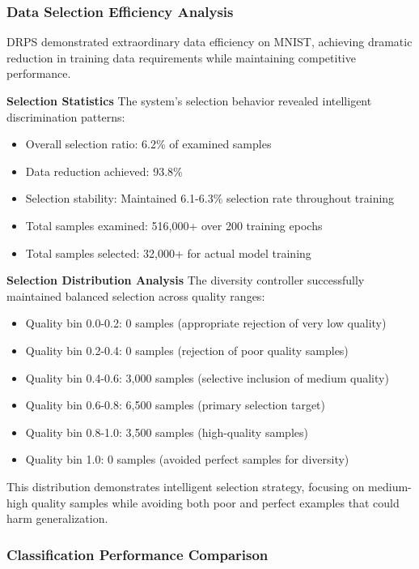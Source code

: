 \documentclass[12pt]{article}
\begin{document}
\subsubsection{Data Selection Efficiency Analysis}\label{selection-efficiency}

DRPS demonstrated extraordinary data efficiency on MNIST, achieving dramatic reduction in training data requirements while maintaining competitive performance.

\textbf{Selection Statistics}
The system's selection behavior revealed intelligent discrimination patterns:
\begin{itemize}
\item Overall selection ratio: 6.2\% of examined samples
\item Data reduction achieved: 93.8\%
\item Selection stability: Maintained 6.1-6.3\% selection rate throughout training
\item Total samples examined: 516,000+ over 200 training epochs
\item Total samples selected: 32,000+ for actual model training
\end{itemize}

\textbf{Selection Distribution Analysis}
The diversity controller successfully maintained balanced selection across quality ranges:
\begin{itemize}
\item Quality bin 0.0-0.2: 0 samples (appropriate rejection of very low quality)
\item Quality bin 0.2-0.4: 0 samples (rejection of poor quality samples)
\item Quality bin 0.4-0.6: 3,000 samples (selective inclusion of medium quality)
\item Quality bin 0.6-0.8: 6,500 samples (primary selection target)
\item Quality bin 0.8-1.0: 3,500 samples (high-quality samples)
\item Quality bin 1.0: 0 samples (avoided perfect samples for diversity)
\end{itemize}

This distribution demonstrates intelligent selection strategy, focusing on medium-high quality samples while avoiding both poor and perfect examples that could harm generalization.

\subsubsection{Classification Performance Comparison}\label{performance-comparison}
\end{document}

